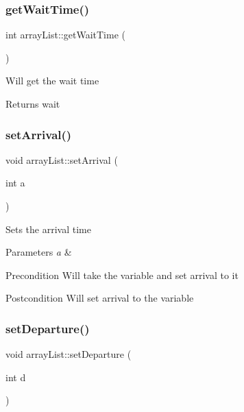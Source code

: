 \subsubsection{\texorpdfstring{get\+Wait\+Time()}{getWaitTime()}}
{\footnotesize\ttfamily int array\+List\+::get\+Wait\+Time (\begin{DoxyParamCaption}{ }\end{DoxyParamCaption})}

Will get the wait time \begin{DoxyReturn}{Returns}
wait 
\end{DoxyReturn}
\mbox{\label{classarray_list_a0270346185db9f1a7e8adf3ab5bc34df}} 
\subsubsection{\texorpdfstring{set\+Arrival()}{setArrival()}}
{\footnotesize\ttfamily void array\+List\+::set\+Arrival (\begin{DoxyParamCaption}\item[{int}]{a }\end{DoxyParamCaption})}

Sets the arrival time 
\begin{DoxyParams}{Parameters}
{\em a} & \\
\hline
\end{DoxyParams}
\begin{DoxyPrecond}{Precondition}
Will take the variable and set arrival to it 
\end{DoxyPrecond}
\begin{DoxyPostcond}{Postcondition}
Will set arrival to the variable 
\end{DoxyPostcond}
\mbox{\label{classarray_list_a9a8eeffa3c8e0ca873bead0477ac48e7}} 
\subsubsection{\texorpdfstring{set\+Departure()}{setDeparture()}}
{\footnotesize\ttfamily void array\+List\+::set\+Departure (\begin{DoxyParamCaption}\item[{int}]{d }\end{DoxyParamCaption})}

